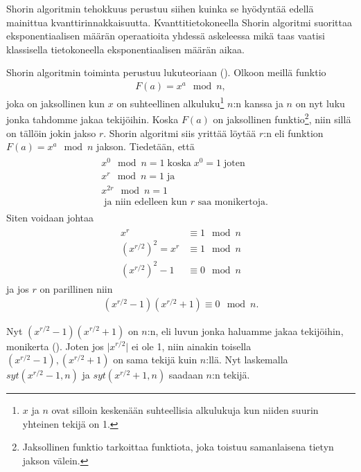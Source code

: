 Shorin algoritmin tehokkuus perustuu siihen kuinka se hyödyntää edellä mainittua kvanttirinnakkaisuutta. Kvanttitietokoneella Shorin algoritmi suorittaa eksponentiaalisen määrän operaatioita yhdessä askeleessa mikä taas vaatisi klassisella tietokoneella eksponentiaalisen määrän aikaa.


Shorin algoritmin toiminta perustuu lukuteoriaan (\cite{hayward2008quantum}).
Olkoon meillä funktio
\begin{align*}
    F(a) = x^{a} \mod n,
\end{align*}
joka on jaksollinen kun $x$ on suhteellinen alkuluku\footnote{$x$ ja $n$ ovat silloin keskenään suhteellisia alkulukuja kun niiden suurin yhteinen tekijä on 1.} $n$:n kanssa ja $n$ on nyt luku jonka tahdomme jakaa tekijöihin. Koska $F(a)$ on jaksollinen funktio\footnote{Jaksollinen funktio tarkoittaa funktiota, joka toistuu samanlaisena tietyn jakson välein.}, niin sillä on tällöin jokin jakso $r$. Shorin algoritmi siis yrittää löytää $r$:n eli funktion $F(a) = x^{a} \mod n$ jakson. Tiedetään, että 
\begin{align*}
    \begin{split}
    & x^{0} \mod n = 1 \; \text{koska} \;  x^0 = 1 \; \text{joten} \\
    & x^{r} \mod n = 1 \; \text{ja} \\
    & x^{2r} \mod n = 1 \\
    & \; \text{ja niin edelleen kun $r$ saa monikertoja.}
    \end{split}
\end{align*}
Siten voidaan johtaa
\begin{align*}
    \begin{split}
    x^{r} & \equiv 1 \mod n \\
    (x^{r/2})^{2} = x^{r} & \equiv 1 \mod n \\
    (x^{r/2})^{2} - 1 & \equiv 0 \mod n
    \end{split}
\end{align*}
ja jos $r$ on parillinen niin
\begin{align*}
    (x^{r/2} - 1)(x^{r/2} + 1) \equiv 0 \mod n.
\end{align*}

Nyt $(x^{r/2} - 1)(x^{r/2} + 1)$ on $n$:n, eli luvun jonka haluamme jakaa tekijöihin, monikerta (\cite{hayward2008quantum}). Joten jos $\lvert x^{r/2} \rvert$ ei ole 1, niin ainakin toisella $(x^{r/2} - 1), (x^{r/2} + 1)$ on sama tekijä kuin $n$:llä. Nyt laskemalla $syt(x^{r/2} - 1, n)$ ja $syt(x^{r/2} + 1, n)$ saadaan $n$:n tekijä.

